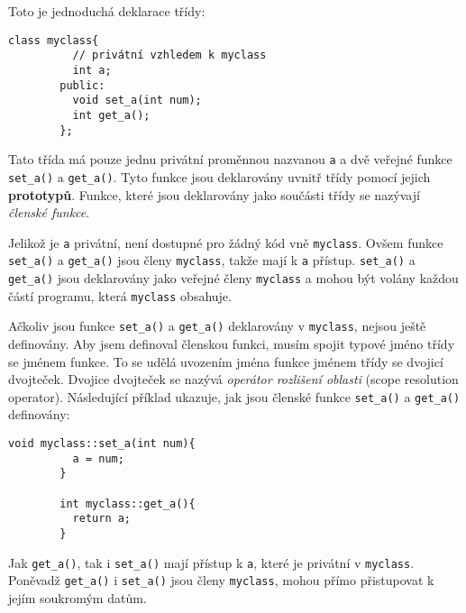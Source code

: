       Toto je jednoduchá deklarace třídy:
  
      \begin{lstlisting}[style=luaCPPStyle]
        class myclass{
          // privátní vzhledem k myclass
          int a;
        public:
          void set_a(int num);
          int get_a();
        };
      \end{lstlisting}
      Tato třída má pouze jednu privátní proměnnou nazvanou \lstinline[style=luaCPPText]!a! a 
      dvě veřejné funkce \lstinline[style=luaCPPText]!set_a()! a 
      \lstinline[style=luaCPPText]!get_a()!. Tyto funkce jsou deklarovány uvnitř třídy pomocí 
      jejich \textbf{prototypů}. Funkce, které jsou deklarovány jako součásti třídy se nazývají 
      \textit{členské funkce}.
  
      Jelikož je \lstinline[style=luaCPPText]!a! privátní, není dostupné pro žádný kód vně
      \lstinline[style=luaCPPText]!myclass!. Ovšem funkce \lstinline[style=luaCPPText]!set_a()! a
      \lstinline[style=luaCPPText]!get_a()! jsou členy \lstinline[style=luaCPPText]!myclass!, takže
      mají k \lstinline[style=luaCPPText]!a! přístup. \lstinline[style=luaCPPText]!set_a()! a
      \lstinline[style=luaCPPText]!get_a()! jsou deklarovány jako veřejné členy
      \lstinline[style=luaCPPText]!myclass! a mohou být volány každou částí programu, která
      \lstinline[style=luaCPPText]!myclass! obsahuje.
  
      Ačkoliv jsou funkce \lstinline[style=luaCPPText]!set_a()! a
      \lstinline[style=luaCPPText]!get_a()!  deklarovány v \lstinline[style=luaCPPText]!myclass!,
      nejsou ještě definovány. Aby jsem definoval členskou funkci, musím spojit typové jméno třídy
      se jménem funkce. To se udělá uvozením jména funkce jménem třídy se dvojicí dvojteček. Dvojice
      dvojteček se nazývá \textit{operátor rozlišení oblasti} (scope resolution operator).
      Následující příklad ukazuje, jak jsou členské funkce \lstinline[style=luaCPPText]!set_a()! a
      \lstinline[style=luaCPPText]!get_a()! definovány:
      \begin{lstlisting}[style=luaCPPStyle]
        void myclass::set_a(int num){
          a = num;
        }
    
        int myclass::get_a(){
          return a;
        }
      \end{lstlisting}
      Jak \lstinline[style=luaCPPText]!get_a()!, tak i \lstinline[style=luaCPPText]!set_a()! mají
      přístup k \lstinline[style=luaCPPText]!a!, které je privátní v
      \lstinline[style=luaCPPText]!myclass!. Poněvadž \lstinline[style=luaCPPText]!get_a()! i
      \lstinline[style=luaCPPText]!set_a()! jsou členy \lstinline[style=luaCPPText]!myclass!, mohou
      přímo přistupovat k jejím soukromým datům.
  

